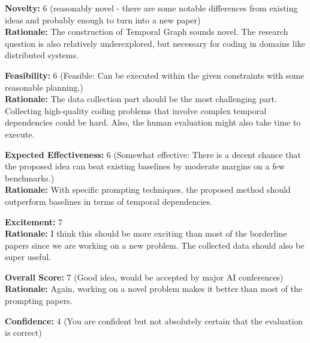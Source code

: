 \begin{tcolorbox}[colback=green!10!white, colframe=green!80!black, title=\textbf{Reviewer 1}]
\small
\textbf{Novelty:} 6 (reasonably novel - there are some notable differences from existing ideas and probably enough to turn into a new paper)\\
\textbf{Rationale:} The construction of Temporal Graph sounds novel. The research question is also relatively underexplored, but necessary for coding in domains like distributed systems.

\vspace{10pt}

\textbf{Feasibility:} 6 (Feasible: Can be executed within the given constraints with some reasonable planning.)\\
\textbf{Rationale:} The data collection part should be the most challenging part. Collecting high-quality coding problems that involve complex temporal dependencies could be hard. Also, the human evaluation might also take time to execute.

\vspace{10pt}

\textbf{Expected Effectiveness:} 6 (Somewhat effective: There is a decent chance that the proposed idea can beat existing baselines by moderate margins on a few benchmarks.)\\
\textbf{Rationale:} With specific prompting techniques, the proposed method should outperform baselines in terms of temporal dependencies.

\vspace{10pt}

\textbf{Excitement:} 7\\
\textbf{Rationale:} I think this should be more exciting than most of the borderline papers since we are working on a new problem. The collected data should also be super useful.

\vspace{10pt}

\textbf{Overall Score:} 7 (Good idea, would be accepted by major AI conferences)\\
\textbf{Rationale:} Again, working on a novel problem makes it better than most of the prompting papers.

\vspace{10pt}

\textbf{Confidence:} 4 (You are confident but not absolutely certain that the evaluation is correct)
\end{tcolorbox}

